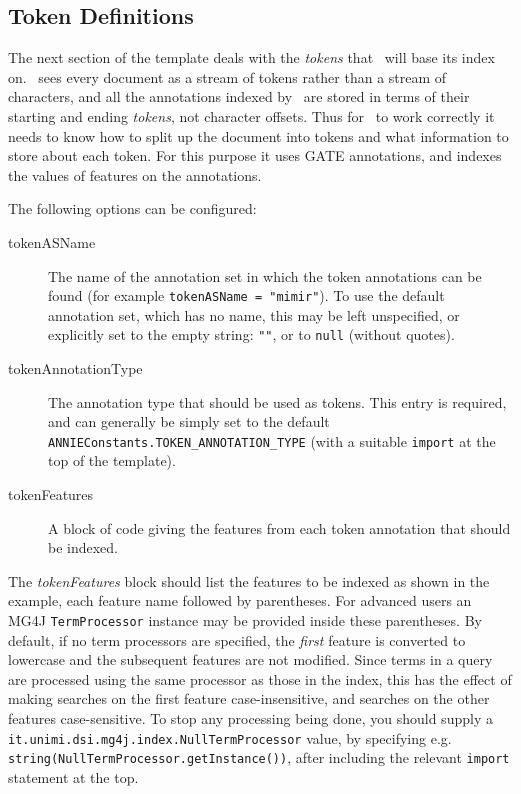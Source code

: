 \subsection*{Token Definitions}\label{sec:indexing:tokens}

The next section of the template deals with the {\em tokens} that \Mimir\ will
base its index on.  \Mimir\ sees every document as a stream of tokens rather
than a stream of characters, and all the annotations indexed by \Mimir\ are
stored in terms of their starting and ending {\em tokens}, not character
offsets.  Thus for \Mimir\ to work correctly it needs to know how to split up
the document into tokens and what information to store about each token.  For
this purpose it uses GATE annotations, and indexes the values of features on
the annotations.

The following options can be configured:
\begin{description}
\item[tokenASName] The name of the annotation set in which the token
  annotations can be found (for example \lstinline!tokenASName = "mimir"!). To
  use the default annotation set, which has no name, this may be left
  unspecified, or explicitly set to the empty string: \lstinline!""!, or to
  \lstinline!null! (without quotes).
\item[tokenAnnotationType] The annotation type that should be used as tokens.
  This entry is required, and can generally be simply set to the default
  \lstinline!ANNIEConstants.TOKEN_ANNOTATION_TYPE! (with a suitable
  \lstinline!import! at the top of the template).
\item[tokenFeatures] A block of code giving the features from each token
  annotation that should be indexed.
\end{description}

The {\em tokenFeatures} block should list the features to be indexed as shown
in the example, each feature name followed by parentheses.  For advanced users
an MG4J \lstinline!TermProcessor! instance may be provided inside these
parentheses.  By default, if no term processors are specified, the {\em first}
feature is converted to lowercase and the subsequent features are not modified.
Since terms in a query are processed using the same processor as those in the
index, this has the effect of making searches on the first feature
case-insensitive, and searches on the other features case-sensitive. To stop
any processing being done, you should supply a
\lstinline!it.unimi.dsi.mg4j.index.NullTermProcessor! value, by specifying e.g.
\lstinline!string(NullTermProcessor.getInstance())!, after including the
relevant \lstinline!import! statement at the top.

